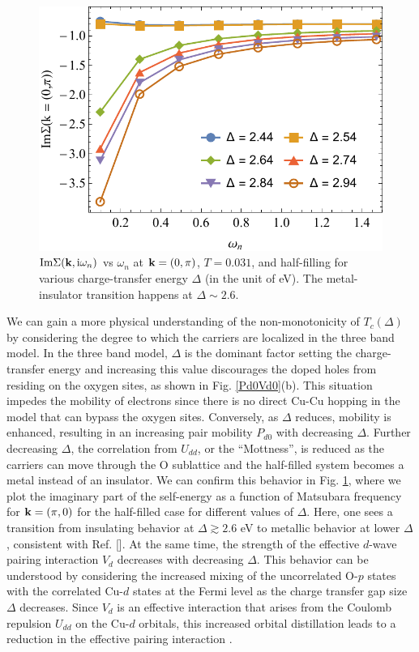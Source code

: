 \documentclass[reprint,nofootinbib,nobibnotes,amsmath,amssymb,aps,prb,floatfix]{revtex4-1}
\newcommand{\refdisp}[1]{Ref. [\onlinecite{#1}]}
\newcommand{\figdisp}[1]{Fig. \ref{#1}}
\begin{document}
\begin{figure}[ht]
\includegraphics[width=0.92\columnwidth]{./Figures/Imsigmavsw.pdf}
\caption{$\mathrm{Im}\Sigma({\bf k},\text{i}\omega_n)$ vs $\omega_n$ at ${\bf k}=(0,\pi)$, $T=0.031$, and half-filling for various charge-transfer energy $\Delta$ (in the unit of eV). The metal-insulator transition happens at $\Delta \sim 2.6$.}
\label{imsigma2by2}
\end{figure}

We can gain a more physical understanding of the non-monotonicity of $T_c(\Delta)$ by considering the degree to which the carriers are localized in the three band model. In the three band model, $\Delta$ is the dominant factor setting the charge-transfer energy and increasing this value discourages the doped holes from residing on the oxygen sites, as shown in \figdisp{Pd0Vd0}(b). 
This situation impedes the mobility of electrons since there is no direct Cu-Cu hopping in the model that can bypass the oxygen sites. Conversely, as $\Delta$ reduces, mobility is enhanced, resulting in an increasing pair mobility $P_{d0}$ with decreasing $\Delta$. Further decreasing $\Delta$, the correlation from $U_{dd}$, or the ``Mottness'', is reduced as the carriers can move through the O sublattice \cite{Cooper} and the half-filled system becomes a metal \cite{ZSA} instead of an insulator. We can confirm this behavior in \figdisp{imsigma2by2}, where we plot the imaginary part of the self-energy as a function of Matsubara frequency for ${\bf k}=(\pi,0)$ for the half-filled case for different values of $\Delta$. Here, one sees a transition from insulating behavior at $\Delta \gtrsim 2.6$ eV to metallic behavior at lower $\Delta$, consistent with \refdisp{Vitali}. At the same time, the strength of the effective $d$-wave pairing interaction $V_d$ decreases with decreasing $\Delta$. This behavior can be understood by considering the increased mixing of the uncorrelated O-$p$ states with the correlated Cu-$d$ states at the Fermi level as the charge transfer gap size $\Delta$ decreases. Since $V_d$ is an effective interaction that arises from the Coulomb repulsion $U_{dd}$ on the Cu-$d$ orbitals, this increased orbital distillation leads to a reduction in the effective pairing interaction \cite{Sakakibara}.   
\end{document}
